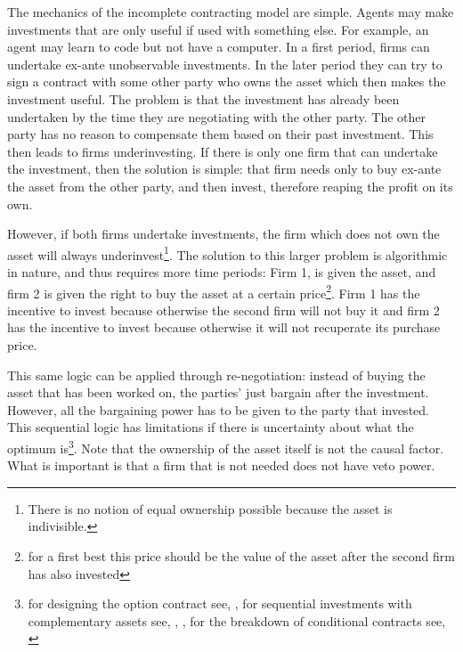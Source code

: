 The mechanics of the incomplete contracting model are simple. Agents may make investments that are only useful if used with something else. For example, an agent may learn to code but not have a computer. In a first period, firms can undertake ex-ante unobservable investments. In the later period they can try to sign a contract with some other party who owns the asset which then makes the investment useful. The problem is that the investment has already been undertaken by the time they are negotiating with the other party. The other party has no reason to compensate them based on their past investment. This then leads to firms underinvesting. If there is only one firm that can undertake the investment, then the solution is simple: that firm needs only to buy ex-ante the asset from the other party, and then invest, therefore reaping the profit on its own.

However, if both firms undertake investments, the firm which does not own the asset will always underinvest\footnote{There is no notion of equal ownership possible because the asset is indivisible.}.  The solution to this larger problem is algorithmic in nature, and thus requires more time periods: Firm 1, is given the asset, and firm 2 is given the right to buy the asset at a certain price\footnote{for a first best this price should be the value of the asset after the second firm has also invested}. Firm 1 has the incentive to invest because otherwise the second firm will not buy it and firm 2 has the incentive to invest because otherwise it will not recuperate its purchase price.

This same logic can be applied through re-negotiation: instead of buying the asset that has been worked on, the parties’ just bargain after the investment. However, all the bargaining power has to be given to the party that invested. This sequential logic has limitations if there is uncertainty about what the optimum is\footnote{for designing the option contract see, \cite{Noldeke1998}, for sequential investments with complementary assets see, \cite{Zhang2014},\cite{bessen_maskin} , for the breakdown of conditional contracts see, \cite{Maskin1999}}. Note that the ownership of the asset itself is not the causal factor. What is important is that a firm that is not needed does not have veto power.

